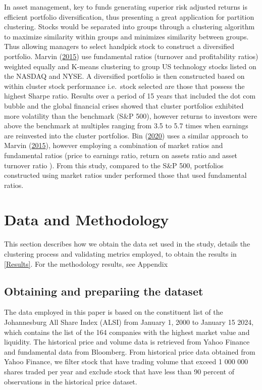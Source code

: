 \documentclass[11pt,preprint, authoryear]{elsarticle}
\numberwithin{equation}{section}
\numberwithin{figure}{section}
\numberwithin{table}{section}
\begin{document}
In asset management, key to funds generating superior risk adjusted
returns is efficient portfolio diversification, thus presenting a great
application for partition clustering. Stocks would be separated into
groups through a clustering algorithm to maximize similarity within
groups and minimizes similarity between groups. Thus allowing managers
to select handpick stock to construct a diversified portfolio. Marvin
(\protect\hyperlink{ref-marvin2015creating}{2015}) use fundamental
ratios (turnover and profitability ratios) weighted equally and K-means
clustering to group US technology stocks listed on the NASDAQ and NYSE.
A diversified portfolio is then constructed based on within cluster
stock performance i.e.~stock selected are those that possess the highest
Sharpe ratio. Results over a period of 15 years that included the dot
com bubble and the global financial crises showed that cluster
portfolios exhibited more volatility than the benchmark (S\&P 500),
however returns to investors were above the benchmark at multiples
ranging from 3.5 to 5.7 times when earnings are reinvested into the
cluster portfolios. Bin (\protect\hyperlink{ref-bin2020k}{2020}) uses a
similar approach to Marvin
(\protect\hyperlink{ref-marvin2015creating}{2015}), however employing a
combination of market ratios and fundamental ratios (price to earnings
ratio, return on assets ratio and asset turnover ratio ). From this
study, compared to the S\&P 500, portfolios constructed using market
ratios under performed those that used fundamental ratios. \newpage

\hypertarget{data-and-methodology}{%
\section{Data and Methodology}\label{data-and-methodology}}

This section describes how we obtain the data set used in the study,
details the clustering process and validating metrics employed, to
obtain the results in \ref{Results}. For the methodology results, see
Appendix

\hypertarget{obtaining-and-prepariing-the-dataset}{%
\subsection{Obtaining and prepariing the
dataset}\label{obtaining-and-prepariing-the-dataset}}

The data employed in this paper is based on the constituent list of the
Johannesburg All Share Index (ALSI) from January 1, 2000 to January 15
2024, which contains the list of the 164 companies with the highest
market value and liquidity. The historical price and volume data is
retrieved from Yahoo Finance and fundamental data from Bloomberg. From
historical price data obtained from Yahoo Finance, we filter stock that
have trading volume that exceed 1 000 000 shares traded per year and
exclude stock that have less than 90 percent of observations in the
historical price dataset.
\end{document}
